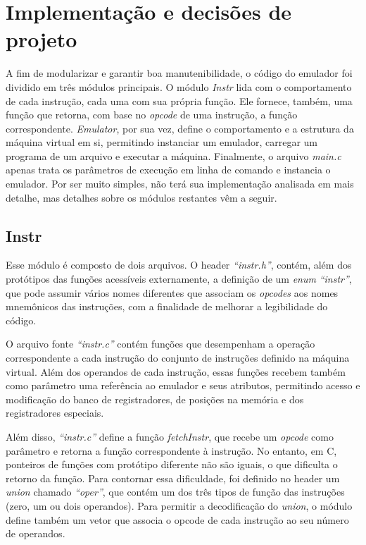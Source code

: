 \documentclass[10pt,a4paper]{article}
\numberwithin{equation}{section}
\begin{document}
\section{Implementação e decisões de projeto}

A fim de modularizar e garantir boa manutenibilidade, o código do emulador foi dividido em três módulos principais. O módulo \emph{Instr} lida com o comportamento de cada instrução, cada uma com sua própria função. Ele fornece, também, uma função que retorna, com base no \emph{opcode} de uma instrução, a função correspondente. \emph{Emulator}, por sua vez, define o comportamento e a estrutura da máquina virtual em si, permitindo instanciar um emulador, carregar um programa de um arquivo e executar a máquina. Finalmente, o arquivo \emph{main.c} apenas trata os parâmetros de execução em linha de comando e instancia o emulador. Por ser muito simples, não terá sua implementação analisada em mais detalhe, mas detalhes sobre os módulos restantes vêm a seguir.

\subsection{Instr}

Esse módulo é composto de dois arquivos. O header \emph{``instr.h''}, contém, além dos protótipos das funções acessíveis externamente, a definição de um \emph{enum} \emph{``instr''}, que pode assumir vários nomes diferentes que associam os \emph{opcodes} aos nomes mnemônicos das instruções, com a finalidade de melhorar a legibilidade do código.

O arquivo fonte \emph{``instr.c''} contém funções que desempenham a operação correspondente a cada instrução do conjunto de instruções definido na máquina virtual. Além dos operandos de cada instrução, essas funções recebem também como parâmetro uma referência ao emulador e seus atributos, permitindo acesso e modificação do banco de registradores, de posições na memória e dos registradores especiais.

Além disso, \emph{``instr.c''} define a função \emph{fetchInstr}, que recebe um \emph{opcode} como parâmetro e retorna a função correspondente à instrução. No entanto, em C, ponteiros de funções com protótipo diferente não são iguais, o que dificulta o retorno da função. Para contornar essa dificuldade, foi definido no header um \emph{union} chamado \emph{``oper''}, que contém um dos três tipos de função das instruções (zero, um ou dois operandos). Para permitir a decodificação do \emph{union}, o módulo define também um vetor que associa o opcode de cada instrução ao seu número de operandos.
\end{document}
